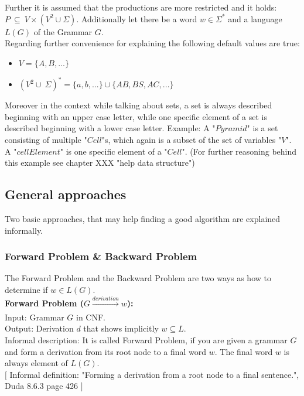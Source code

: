 \noindent Further it is assumed that the productions are more restricted and it holds: $P\ \subseteq\ V \times (V^{2} \cup \Sigma)$. Additionally let there be a word $w \in \Sigma^*$ and a language $L(G)$ of the Grammar $G$. \\
\noindent Regarding further convenience for explaining the following default values are true:
\begin{itemize}
	\item $V = \{A, B, ...\}$
	\item $(V^2 \cup\ \Sigma)^{*}=\{a, b, ...\} \cup \{AB, BS, AC, ... \}$
\end{itemize}
\noindent Moreover in the context while talking about sets, a set is always described beginning with an upper case letter, while one specific element of a set is described beginning with a lower case letter. Example: A "$Pyramid$" is a set consisting of multiple "$Cell$"s, which again is a subset of the set of variables "$V$". A "$cellElement$" is one specific element of a "$Cell$". (For further reasoning behind this example see chapter XXX "help data structure") 

\subsection{General approaches}
Two basic approaches, that may help finding a good algorithm are explained informally.

\subsubsection{Forward Problem \& Backward Problem}
The Forward Problem and the Backward Problem are two ways as how to determine if $w \in L(G)$. \\ 

\noindent\textbf{Forward Problem ($G \xrightarrow[]{derivation} w$):}\\
Input: Grammar $G$ in CNF.\\
Output: Derivation $d$ that shows implicitly $w \subseteq L$.\\

\noindent Informal description: It is called Forward Problem, if you are given a grammar $G$ and form a derivation from its root node to a final word $w$. The final word $w$ is always element of $L(G)$.\\
$[$ Informal definition: "Forming a derivation from a root node to a final sentence.", Duda 8.6.3 page 426 $]$ \\

